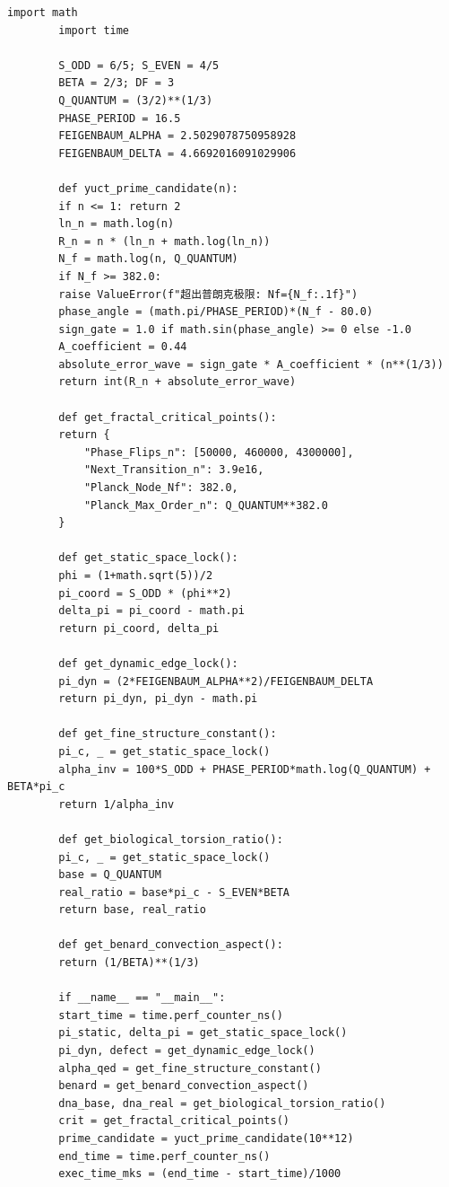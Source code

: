 \documentclass[12pt,a4paper]{article}
\begin{document}
	\begin{lstlisting}[caption={完整 YUCT 协调引擎 v4.0 (\texttt{yuct\_constants.py})}, label={lst:yuct-engine}]
		import math
		import time
		
		S_ODD = 6/5; S_EVEN = 4/5
		BETA = 2/3; DF = 3
		Q_QUANTUM = (3/2)**(1/3)
		PHASE_PERIOD = 16.5
		FEIGENBAUM_ALPHA = 2.5029078750958928
		FEIGENBAUM_DELTA = 4.6692016091029906
		
		def yuct_prime_candidate(n):
		if n <= 1: return 2
		ln_n = math.log(n)
		R_n = n * (ln_n + math.log(ln_n))
		N_f = math.log(n, Q_QUANTUM)
		if N_f >= 382.0:
		raise ValueError(f"超出普朗克极限: Nf={N_f:.1f}")
		phase_angle = (math.pi/PHASE_PERIOD)*(N_f - 80.0)
		sign_gate = 1.0 if math.sin(phase_angle) >= 0 else -1.0
		A_coefficient = 0.44
		absolute_error_wave = sign_gate * A_coefficient * (n**(1/3))
		return int(R_n + absolute_error_wave)
		
		def get_fractal_critical_points():
		return {
			"Phase_Flips_n": [50000, 460000, 4300000],
			"Next_Transition_n": 3.9e16,
			"Planck_Node_Nf": 382.0,
			"Planck_Max_Order_n": Q_QUANTUM**382.0
		}
		
		def get_static_space_lock():
		phi = (1+math.sqrt(5))/2
		pi_coord = S_ODD * (phi**2)
		delta_pi = pi_coord - math.pi
		return pi_coord, delta_pi
		
		def get_dynamic_edge_lock():
		pi_dyn = (2*FEIGENBAUM_ALPHA**2)/FEIGENBAUM_DELTA
		return pi_dyn, pi_dyn - math.pi
		
		def get_fine_structure_constant():
		pi_c, _ = get_static_space_lock()
		alpha_inv = 100*S_ODD + PHASE_PERIOD*math.log(Q_QUANTUM) + BETA*pi_c
		return 1/alpha_inv
		
		def get_biological_torsion_ratio():
		pi_c, _ = get_static_space_lock()
		base = Q_QUANTUM
		real_ratio = base*pi_c - S_EVEN*BETA
		return base, real_ratio
		
		def get_benard_convection_aspect():
		return (1/BETA)**(1/3)
		
		if __name__ == "__main__":
		start_time = time.perf_counter_ns()
		pi_static, delta_pi = get_static_space_lock()
		pi_dyn, defect = get_dynamic_edge_lock()
		alpha_qed = get_fine_structure_constant()
		benard = get_benard_convection_aspect()
		dna_base, dna_real = get_biological_torsion_ratio()
		crit = get_fractal_critical_points()
		prime_candidate = yuct_prime_candidate(10**12)
		end_time = time.perf_counter_ns()
		exec_time_mks = (end_time - start_time)/1000
		

\end{lstlisting}
\end{document}
